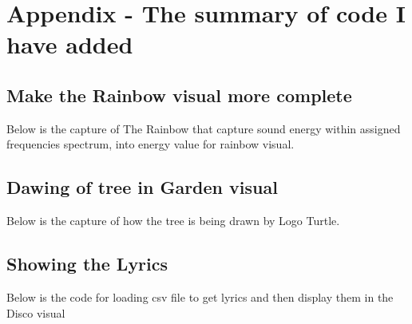 \section*{ Appendix - The summary of code I have added}

\subsection*{Make the Rainbow visual more complete}

Below is the capture of The Rainbow that capture sound energy within assigned frequencies spectrum, into energy value for rainbow visual.



\subsection*{Dawing of tree in Garden visual}

Below is the capture of how the tree is being drawn by Logo Turtle.



\subsection*{Showing the Lyrics}

Below is the code for loading csv file to get lyrics and then display them in the Disco visual



